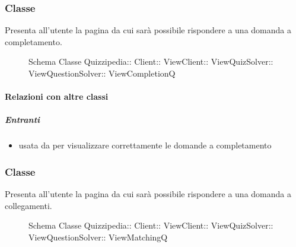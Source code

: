 \subsubsection{Classe }
Presenta all'utente la pagina da cui sarà possibile rispondere a una domanda a completamento.
\begin{figure}[H]
\centering
\noindent{}
\caption[Schema Classe ViewCompletionQ]{Schema Classe Quizzipedia:: Client:: ViewClient:: ViewQuizSolver:: ViewQuestionSolver:: ViewCompletionQ}
\end{figure}
\paragraph{Relazioni con altre classi}
\subparagraph{Entranti}
\begin{itemize}
\item usata da  per visualizzare correttamente le domande a completamento
\end{itemize}
\subsubsection{Classe }
Presenta all'utente la pagina da cui sarà possibile rispondere a una domanda a collegamenti.
\begin{figure}[H]
\centering
\noindent{}
\caption[Schema Classe ViewMatchingQ]{Schema Classe Quizzipedia:: Client:: ViewClient:: ViewQuizSolver:: ViewQuestionSolver:: ViewMatchingQ}
\end{figure}
